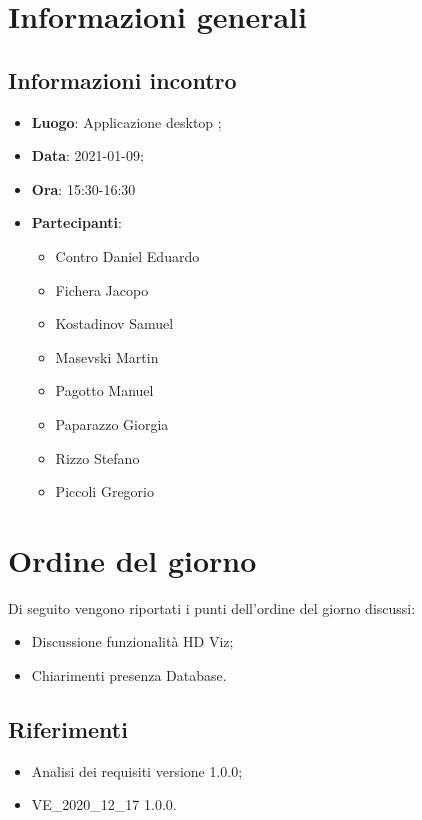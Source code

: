 \documentclass{article}
\begin{document}


\section{Informazioni generali}
\label{sec:info_generali}

\subsection{Informazioni incontro}
\label{sub:info_incontro}

\begin{itemize}
	\item \textbf{Luogo}: Applicazione desktop ;
	\item \textbf{Data}: 2021-01-09;
	\item \textbf{Ora}: 15:30-16:30
	\item \textbf{Partecipanti}:
	\begin{itemize}
		\item Contro Daniel Eduardo
		\item Fichera Jacopo
		\item Kostadinov Samuel
		\item Masevski Martin
		\item Pagotto Manuel
		\item Paparazzo Giorgia
		\item Rizzo Stefano
		\item Piccoli Gregorio
	\end{itemize}
\end{itemize}

\section{Ordine del giorno}%
\label{sec:ordine_del_giorno}

Di seguito vengono riportati i punti dell'ordine del giorno discussi:
\begin{itemize}
    \item Discussione funzionalità HD Viz;
    \item Chiarimenti presenza Database.
\end{itemize}


\subsection{Riferimenti}%
\label{sub:riferimenti}
\begin{itemize}
    \item Analisi dei requisiti versione 1.0.0;
	\item VE\_2020\_12\_17 1.0.0.
\end{itemize}
\end{document}

